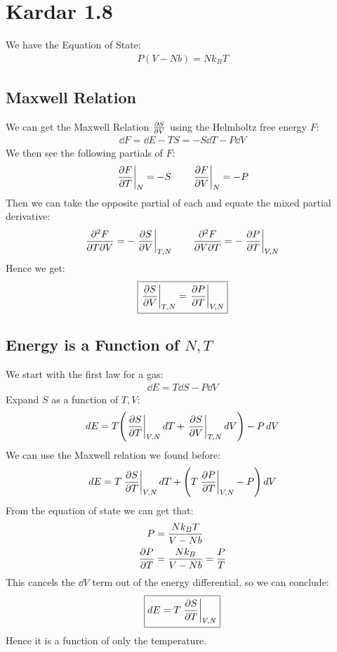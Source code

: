 \documentclass[12pt]{article}
\begin{document}
\section{Kardar 1.8}
We have the Equation of State:
\begin{align*}
  P(V-Nb)=Nk_BT
\end{align*}
\subsection{Maxwell Relation}
We can get the Maxwell Relation $\pdv{S}{V}$ using the Helmholtz free energy $F$:
\begin{align*}
  \dd{F}=\dd{E-TS}=-S\dd{T}-P\dd{V}
\end{align*}
We then see the following partials of $F$:
\begin{align*}
  \eval{\pdv{F}{T}}_{N}=-S\qquad
  \eval{\pdv{F}{V}}_{N}=-P
\end{align*}
Then we can take the opposite partial of each and equate the mixed partial derivative:
\begin{align*}
  \pdv{F}{T}{V}=-\eval{\pdv{S}{V}}_{T,N}\qquad
  \pdv{F}{V}{T}=-\eval{\pdv{P}{T}}_{V,N}
\end{align*}
Hence we get:
\begin{align}
  \boxed{\eval{\pdv{S}{V}}_{T,N}=\eval{\pdv{P}{T}}_{V,N}}
\end{align}
\subsection{Energy is a Function of $N,T$}
We start with the first law for a gas:
\begin{align*}
  \dd{E}=T\dd{S}-P\dd{V}
\end{align*}
Expand $S$ as a function of $T,V$:
\begin{align*}
  \dd{E}=T\qty(\eval{\pdv{S}{T}}_{V,N}\dd{T}+\eval{\pdv{S}{V}}_{T,N}\dd{V})
  -P\dd{V}
\end{align*}
We can use the Maxwell relation we found before:
\begin{align*}
  \dd{E}=T\eval{\pdv{S}{T}}_{V,N}\dd{T}+\qty(T\eval{\pdv{P}{T}}_{V,N}-P)\dd{V}
\end{align*}
From the equation of state we can get that:
\begin{align*}
  P&=\frac{Nk_BT}{V-Nb}\\
  \pdv{P}{T}&=\frac{Nk_B}{V-Nb}=\frac{P}{T}
\end{align*}
This cancels the $\dd{V}$ term out of the energy differential, so we can conclude:
\begin{align}
  \boxed{\dd{E}=T\eval{\pdv{S}{T}}_{V,N}}
\end{align}
Hence it is a function of only the temperature.
\end{document}
